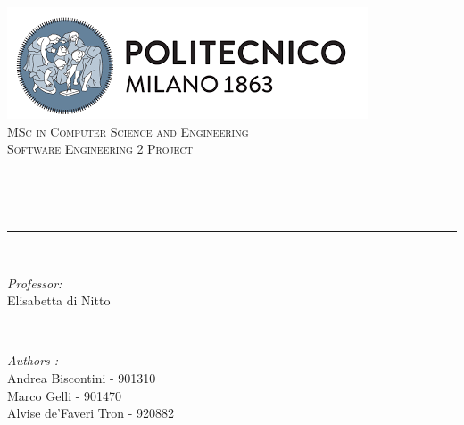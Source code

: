 \begin{titlepage}
	\centering
    \vspace*{0.5 cm}
    \includegraphics[scale = 0.75]{Images/Polimilogo}\\[1.0 cm]	%
    \textsc{\LARGE MSc in Computer Science and Engineering}\\[2.0 cm]	%
	\textsc{\Large Software Engineering 2 Project}\\[0.5 cm]				%
	\rule{\linewidth}{0.2 mm} \\[0.4 cm]
	{ \huge \bfseries \thetitle}\\
	\rule{\linewidth}{0.2 mm} \\[1.5 cm]
	
	\begin{minipage}{0.4\textwidth}
		\begin{flushleft} \large
			\emph{Professor:}\\
			Elisabetta di Nitto\\
			\end{flushleft}
			\end{minipage}~
			\begin{minipage}{0.4\textwidth}
            
			\begin{flushright} \large
			\emph{Authors :} \\
			Andrea Biscontini - 901310\\
			Marco Gelli - 901470\\
			Alvise de'Faveri Tron - 920882\\
		\end{flushright}
        
	\end{minipage}\\[2 cm]
	
	
    
    
    
    
	
\end{titlepage}





